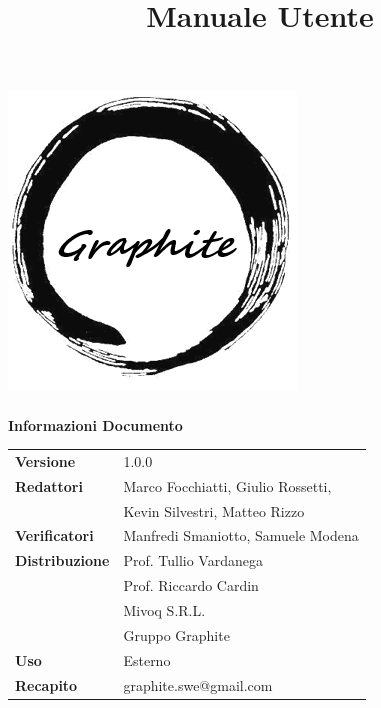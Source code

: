 \documentclass[openany,12pt,a4paper]{report}
\title{Manuale Utente}
\author{}
\newcommand{\versione}{1.0.0}
\begin{document}
	\makeatletter
	\begin{titlepage}
		\setlength{\headsep}{0pt}  
		\begin{center}
			\includegraphics[width=0.5\linewidth]{img/logo.png}\\[1em]
			{\huge \bfseries  \@title }\\[10ex]
			\textbf{\Large Informazioni Documento} \\[2em]
			\bgroup
			\def\arraystretch{1.5}
			\begin{tabular}{l|l}
				\textbf{Versione} & \versione{} \\
				\textbf{Redattori} & Marco Focchiatti, Giulio Rossetti, \\
				& Kevin Silvestri, Matteo Rizzo \\
				\textbf{Verificatori} & Manfredi Smaniotto, Samuele Modena \\
				\textbf{Distribuzione} & Prof. Tullio Vardanega \\
				& Prof. Riccardo Cardin \\
				& Mivoq S.R.L. \\
				& Gruppo Graphite \\
				\textbf{Uso} & Esterno \\
				\textbf{Recapito} & graphite.swe@gmail.com \\
			\end{tabular}
			\egroup
		\end{center}
	\end{titlepage}
	\makeatother
	
	\thispagestyle{empty}
	\newpage
	
	
\end{document}
